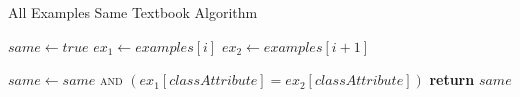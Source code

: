 \begin{algorithm}[H]
\caption{All Examples Same Textbook Algorithm}\label{a:id3-same-simple}
\begin{algorithmic}[1]
    \State $same \gets true$
        \State $ex_1 \gets examples[i]$
        \State $ex_2 \gets examples[i+1]$

        \State $same \gets same$ \textsc{and} $(ex_1[classAttribute] = ex_2[classAttribute])$
    \EndFor
    \State \textbf{return} $same$
\EndProcedure
\end{algorithmic}
\end{algorithm}
